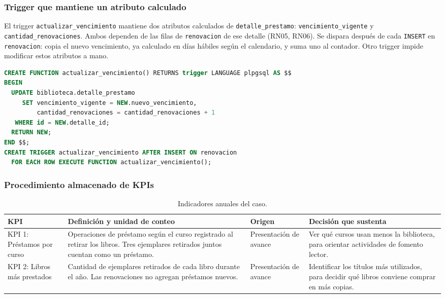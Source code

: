 \documentclass[11pt,a4paper]{article}
\begin{document}
\subsubsection{Trigger que mantiene un atributo calculado}
El trigger \texttt{actualizar\_vencimiento} mantiene dos atributos calculados de \texttt{detalle\_prestamo}: \texttt{vencimiento\_vigente} y \texttt{cantidad\_renovaciones}. Ambos dependen de las filas de \texttt{renovacion} de ese detalle (RN05, RN06). Se dispara después de cada \texttt{INSERT} en \texttt{renovacion}: copia el nuevo vencimiento, ya calculado en días hábiles según el calendario, y suma uno al contador. Otro trigger impide modificar estos atributos a mano.
\begin{lstlisting}[language=SQL]
CREATE FUNCTION actualizar_vencimiento() RETURNS trigger LANGUAGE plpgsql AS $$
BEGIN
  UPDATE biblioteca.detalle_prestamo
     SET vencimiento_vigente = NEW.nuevo_vencimiento,
         cantidad_renovaciones = cantidad_renovaciones + 1
   WHERE id = NEW.detalle_id;
  RETURN NEW;
END $$;
CREATE TRIGGER actualizar_vencimiento AFTER INSERT ON renovacion
  FOR EACH ROW EXECUTE FUNCTION actualizar_vencimiento();
\end{lstlisting}

\subsubsection{Procedimiento almacenado de KPIs}
\begin{table}[H]
\centering
\caption{Indicadores anuales del caso.}
\small
\begin{tabularx}{\textwidth}{l Y l Y}
\toprule
\textbf{KPI} & \textbf{Definición y unidad de conteo} & \textbf{Origen} & \textbf{Decisión que sustenta}\\
\midrule
KPI 1: Préstamos por curso & Operaciones de préstamo según el curso registrado al retirar los libros. Tres ejemplares retirados juntos cuentan como un préstamo. & Presentación de avance & Ver qué cursos usan menos la biblioteca, para orientar actividades de fomento lector.\\
KPI 2: Libros más prestados & Cantidad de ejemplares retirados de cada libro durante el año. Las renovaciones no agregan préstamos nuevos. & Presentación de avance & Identificar los títulos más utilizados, para decidir qué libros conviene comprar en más copias.\\
\bottomrule
\end{tabularx}
\end{table}
\end{document}
